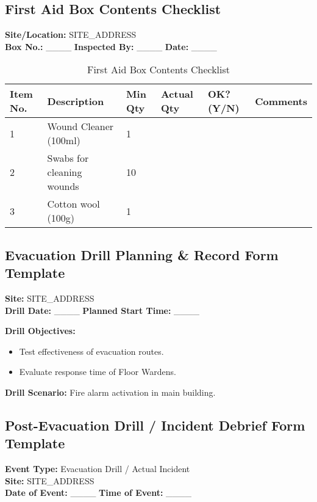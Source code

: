 \documentclass[11pt]{article}
\newcommand{\siteAddress}{{{SITE_ADDRESS}}}
\begin{document}
\subsection*{First Aid Box Contents Checklist}

\textbf{Site/Location:} \siteAddress \\
\textbf{Box No.:} \_\_\_\_ \textbf{Inspected By:} \_\_\_\_ \textbf{Date:} \_\_\_\_

\begin{table}[h]
    \centering
    \begin{tabular}{p{3cm}p{6cm}p{2cm}p{2cm}p{2cm}p{3cm}}
        \toprule
        \textbf{Item No.} & \textbf{Description} & \textbf{Min Qty} & \textbf{Actual Qty} & \textbf{OK? (Y/N)} & \textbf{Comments} \\
        \midrule
        1 & Wound Cleaner (100ml) & 1 & & & \\
        2 & Swabs for cleaning wounds & 10 & & & \\
        3 & Cotton wool (100g) & 1 & & & \\
        \bottomrule
    \end{tabular}
    \caption{First Aid Box Contents Checklist}
\end{table}

\subsection*{Evacuation Drill Planning \& Record Form Template}

\textbf{Site:} \siteAddress \\
\textbf{Drill Date:} \_\_\_\_ \textbf{Planned Start Time:} \_\_\_\_

\textbf{Drill Objectives:}
\begin{itemize}
    \item Test effectiveness of evacuation routes.
    \item Evaluate response time of Floor Wardens.
\end{itemize}

\textbf{Drill Scenario:} Fire alarm activation in main building.

\subsection*{Post-Evacuation Drill / Incident Debrief Form Template}

\textbf{Event Type:} Evacuation Drill / Actual Incident \\
\textbf{Site:} \siteAddress \\
\textbf{Date of Event:} \_\_\_\_ \textbf{Time of Event:} \_\_\_\_
\end{document}
